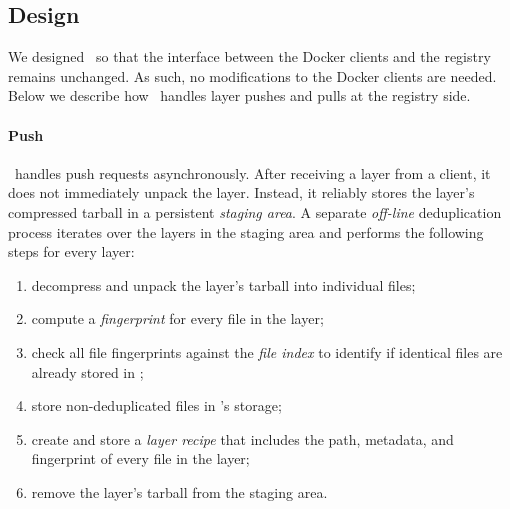 \subsection{Design}
\label{sec:design}

%

We designed \sysname\ so that the interface between the Docker clients and the
registry remains unchanged.
%
As such, no modifications to the Docker clients are needed.
%
Below we describe how \sysname\ handles layer pushes and
pulls at the registry side.
%

\paragraph{Push}
%
\sysname\ handles push requests asynchronously.
%
After receiving a layer from a client, it does not immediately unpack the layer.
%
Instead, it reliably stores the layer's compressed tarball in a persistent
\emph{staging area}.
%
A separate \emph{off-line} deduplication process iterates over the layers in
the staging area and performs the following steps for every layer:
%

 \begin{enumerate}
  \item decompress and unpack the layer's tarball into individual files;
  \item compute a \emph{fingerprint} for every file in the layer;
  \item check all file fingerprints against the \emph{file index} to
	identify if identical files are already stored in \sysname;
  \item store non-deduplicated files in \sysname's storage;
  \item create and store a \emph{layer recipe} that includes the path,
	metadata, and fingerprint of every file in the layer;
  \item remove the layer's tarball from the staging area.
\end{enumerate}

